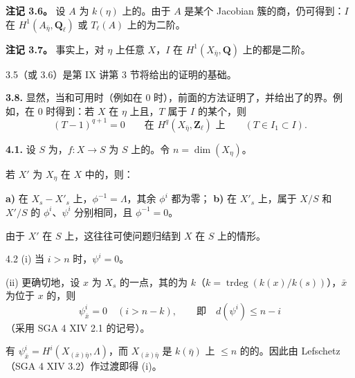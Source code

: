\textbf{注记 3.6。} 设 $A$ 为 $k(\eta)$ 上的。由于 $A$ 是某个 Jacobian 簇的商，仍可得到：$I$ 在 $H^1(A_{\bar\eta},\mathbf Q_\ell)$ 或 $T_\ell(A)$ 上的为二阶。

\textbf{注记 3.7。} 事实上，对 $\eta$ 上任意 $X$，$I$ 在 $H^1(X_{\bar\eta},\mathbf Q)$ 上的都是二阶。

 3.5（或 3.6）是第 IX 讲第 3 节将给出的证明的基础。

\textbf{3.8.} 显然，当和可用时（例如在 $0$ 时），前面的方法证明了，并给出了的界。例如，在 $0$ 时得到：若 $X$ 在 $\eta$ 上且，$T$ 属于 $I$ 的某个，则
\[
(T-1)^{q+1}=0\qquad\text{在 }H^q(X_{\bar\eta},\mathbf Z_\ell)\text{ 上}
\qquad(T\in I_1\subset I).
\]

\textbf{4.1.} 设 $S$ 为，$f:X\to S$ 为 $S$ 上的。令 $n=\dim(X_\eta)$。

若 $X'$ 为 $X_\eta$ 在 $X$ 中的，则：

\textbf{a)} 在 $X_s-X'_s$ 上，$\phi^{-1}=\Lambda$，其余 $\phi^i$ 都为零；
\textbf{b)} 在 $X'_s$ 上，属于 $X/S$ 和 $X'/S$ 的 $\phi^i$、$\psi^i$ 分别相同，且 $\phi^{-1}=0$。

由于 $X'$ 在 $S$ 上，这往往可使问题归结到 $X$ 在 $S$ 上的情形。

\begin{SGAresult}{}{4.2}
\textup{(i)} 当 $i>n$ 时，$\psi^i=0$。

\textup{(ii)} 更确切地，设 $x$ 为 $X_s$ 的一点，其的为 $k$（$k=\operatorname{trdeg}(k(x)/k(s))$），$\bar x$ 为位于 $x$ 的，则
\[
\psi^i_{\bar x}=0\quad(i>n-k),\qquad\text{即}\quad d(\psi^i)\le n-i
\]
（采用 SGA 4 XIV 2.1 的记号）。
\end{SGAresult}
有 $\psi^i_{\bar x}=H^i(X_{(\bar x)\bar\eta},\Lambda)$，而 $X_{(\bar x)\bar\eta}$ 是 $k(\bar\eta)$ 上 $\le n$ 的的。因此由 Lefschetz （SGA 4 XIV 3.2）作过渡即得 (i)。

